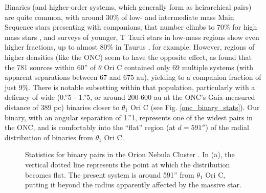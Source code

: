 Binaries (and higher-order systems, which generally form as heirarchical pairs) are quite common, with around 30\% of low- and intermediate mass Main Sequence stars presenting with companions; that number climbs to 70\% for high mass stars \citep{Sana2012}, and surveys of younger, T Tauri stars in low-mass regions show even higher fractions, up to almost 80\% in Taurus \citep{Kraus2011}, for example. However, regions of higher densities (like the ONC) seem to have the opposite effect, as \citet{Reipurth2007} found that the 781 sources within 60'' of $\theta$ Ori C contained only 69 multiple systems (with apparent separations between 67 and 675 au), yielding to a companion fraction of just 9\%. There is notable subsetting within that population, particularly with a defiency of wide (0.''5 - 1.''5, or around 200-600 au at the ONC's Gaia-measured distance of 389 pc) binaries closer to $\theta_1$ Ori C (see Fig. \ref{onc_binary_stats}). Our binary, with an angular separation of 1.''1, represents one of the widest pairs in the ONC, and is comfortably into the ``flat'' region (at $d = 591''$) of the radial distribution of binaries from $\theta_1$ Ori C.





\begin{figure}[h]
  \hspace*{\fill}%
  \hspace*{\fill}%
  \caption{Statistics for binary pairs in the Orion Nebula Cluster \citep{Reipurth2007}. In (a), the vertical dotted line represents the point at which the distribution becomes flat. The present system is around 591'' from $\theta_1$ Ori C, putting it beyond the radius apparently affected by the massive star.}
  \label{fig:onc_binary_stats}
\end{figure}




